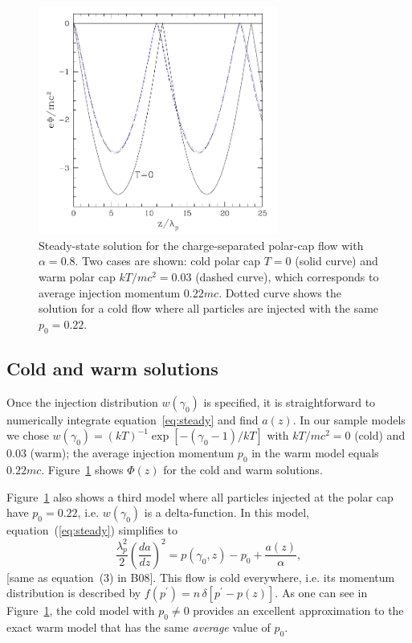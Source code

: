 \begin{figure}[h]
\begin{center}
  \includegraphics[width=0.7\textwidth]{pics/chap2/f1.png}
  \caption[Steady-state solution for $\alpha < 0$]{Steady-state solution for the
    charge-separated polar-cap flow with $\alpha=0.8$. Two cases are shown: cold
    polar cap $T=0$ (solid curve) and warm polar cap $kT/mc^2=0.03$ (dashed
    curve), which corresponds to average injection momentum $0.22mc$. Dotted
    curve shows the solution for a cold flow where all particles are injected
    with the same $p_0=0.22$. }
\label{fig:steady}
\end{center}
\end{figure}


\subsection{Cold and warm solutions}\label{sec:solutions}

Once the injection distribution $w(\gamma_0)$ is specified,
it is straightforward to numerically integrate equation~\eqref{eq:steady} and find $a(z)$.
In our sample models we chose
$w(\gamma_0)=(kT)^{-1}\exp[-(\gamma_0-1)/kT]$ with $kT/mc^2=0$ (cold) and
0.03 (warm); the average injection momentum $p_0$ in the warm model equals
$0.22mc$. Figure~\ref{fig:steady} shows $\Phi(z)$ for the cold and warm solutions.

Figure~\ref{fig:steady} also shows a third model where all particles injected at the polar cap
have $p_0=0.22$, i.e. $w(\gamma_0)$ is a delta-function.
In this model, equation~(\ref{eq:steady}) simplifies to
\begin{equation}
\label{eq:cold}
    \frac{\lambda_p^2}{2}\left(\frac{da}{dz}\right)^2 = p(\gamma_0,z)-p_0
                                                                               + \frac{a(z)}{\alpha},
\end{equation}
[same as equation~(3) in B08]. This flow is cold everywhere, i.e. its momentum
distribution is described by $f(p^\prime)=n\,\delta[p^\prime-p(z)]$.
As one can see in Figure~\ref{fig:steady}, the cold model with $p_0\neq 0$ provides an
excellent approximation to the exact warm model that has the same {\it average}
value of $p_0$.

